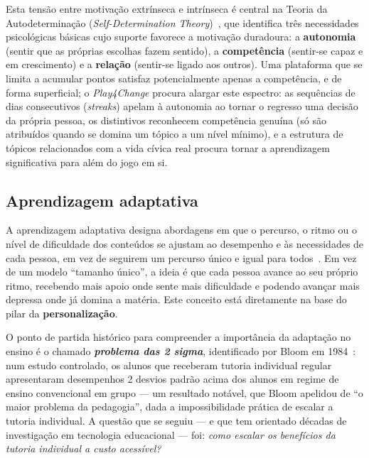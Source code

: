 \begin{sloppypar}
Esta tensão entre motivação extrínseca e intrínseca é central na Teoria da Autodeterminação (\emph{Self-Determination Theory})~\cite{deci1985intrinsic}, que identifica três necessidades psicológicas básicas cujo suporte favorece a motivação duradoura: a \textbf{autonomia} (sentir que as próprias escolhas fazem sentido), a \textbf{competência} (sentir-se capaz e em crescimento) e a \textbf{relação} (sentir-se ligado aos outros). Uma plataforma que se limita a acumular pontos satisfaz potencialmente apenas a competência, e de forma superficial; o \emph{Play4Change} procura alargar este espectro: as sequências de dias consecutivos (\emph{streaks}) apelam à autonomia ao tornar o regresso uma decisão da própria pessoa, os distintivos reconhecem competência genuína (só são atribuídos quando se domina um tópico a um nível mínimo), e a estrutura de tópicos relacionados com a vida cívica real procura tornar a aprendizagem significativa para além do jogo em si.
\end{sloppypar}

\subsection*{Aprendizagem adaptativa}

A aprendizagem adaptativa designa abordagens em que o percurso, o ritmo ou o nível de dificuldade dos conteúdos se ajustam ao desempenho e às necessidades de cada pessoa, em vez de seguirem um percurso único e igual para todos~\cite{vanlehn2011relative}. Em vez de um modelo ``tamanho único'', a ideia é que cada pessoa avance ao seu próprio ritmo, recebendo mais apoio onde sente mais dificuldade e podendo avançar mais depressa onde já domina a matéria. Este conceito está diretamente na base do pilar da \textbf{personalização}.

O ponto de partida histórico para compreender a importância da adaptação no ensino é o chamado \textbf{\emph{problema das 2 sigma}}, identificado por Bloom em 1984~\cite{bloom1984sigma}: num estudo controlado, os alunos que receberam tutoria individual regular apresentaram desempenhos 2 desvios padrão acima dos alunos em regime de ensino convencional em grupo --- um resultado notável, que Bloom apelidou de ``o maior problema da pedagogia'', dada a impossibilidade prática de escalar a tutoria individual. A questão que se seguiu --- e que tem orientado décadas de investigação em tecnologia educacional --- foi: \emph{como escalar os benefícios da tutoria individual a custo acessível?}

